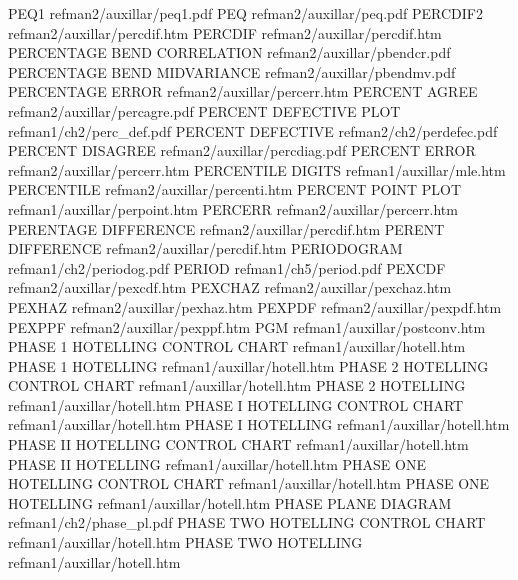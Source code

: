 PEQ1                                    refman2/auxillar/peq1.pdf
PEQ                                     refman2/auxillar/peq.pdf
PERCDIF2                                refman2/auxillar/percdif.htm
PERCDIF                                 refman2/auxillar/percdif.htm
PERCENTAGE BEND CORRELATION             refman2/auxillar/pbendcr.pdf
PERCENTAGE BEND MIDVARIANCE             refman2/auxillar/pbendmv.pdf
PERCENTAGE ERROR                        refman2/auxillar/percerr.htm
PERCENT AGREE                           refman2/auxillar/percagre.pdf
PERCENT DEFECTIVE PLOT                  refman1/ch2/perc_def.pdf
PERCENT DEFECTIVE                       refman2/ch2/perdefec.pdf
PERCENT DISAGREE                        refman2/auxillar/percdiag.pdf
PERCENT ERROR                           refman2/auxillar/percerr.htm
PERCENTILE DIGITS                       refman1/auxillar/mle.htm
PERCENTILE                              refman2/auxillar/percenti.htm
PERCENT POINT PLOT                      refman1/auxillar/perpoint.htm
PERCERR                                 refman2/auxillar/percerr.htm
PERENTAGE DIFFERENCE                    refman2/auxillar/percdif.htm
PERENT DIFFERENCE                       refman2/auxillar/percdif.htm
PERIODOGRAM                             refman1/ch2/periodog.pdf
PERIOD                                  refman1/ch5/period.pdf
PEXCDF                                  refman2/auxillar/pexcdf.htm
PEXCHAZ                                 refman2/auxillar/pexchaz.htm
PEXHAZ                                  refman2/auxillar/pexhaz.htm
PEXPDF                                  refman2/auxillar/pexpdf.htm
PEXPPF                                  refman2/auxillar/pexppf.htm
PGM                                     refman1/auxillar/postconv.htm
PHASE 1 HOTELLING CONTROL CHART         refman1/auxillar/hotell.htm
PHASE 1 HOTELLING                       refman1/auxillar/hotell.htm
PHASE 2 HOTELLING CONTROL CHART         refman1/auxillar/hotell.htm
PHASE 2 HOTELLING                       refman1/auxillar/hotell.htm
PHASE I HOTELLING CONTROL CHART         refman1/auxillar/hotell.htm
PHASE I HOTELLING                       refman1/auxillar/hotell.htm
PHASE II HOTELLING CONTROL CHART        refman1/auxillar/hotell.htm
PHASE II HOTELLING                      refman1/auxillar/hotell.htm
PHASE ONE HOTELLING CONTROL CHART       refman1/auxillar/hotell.htm
PHASE ONE HOTELLING                     refman1/auxillar/hotell.htm
PHASE PLANE DIAGRAM                     refman1/ch2/phase_pl.pdf
PHASE TWO HOTELLING CONTROL CHART       refman1/auxillar/hotell.htm
PHASE TWO HOTELLING                     refman1/auxillar/hotell.htm
